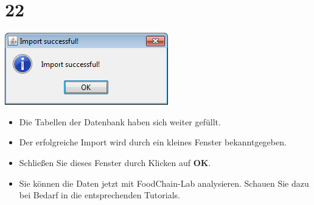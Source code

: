 \documentclass{beamer}
\begin{document}
\section{22}
\begin{frame}
	\begin{center}
  		\includegraphics[height=0.3\textheight]{22.png}
	\end{center}
	\begin{itemize}
		\item Die Tabellen der Datenbank haben sich weiter gefüllt.
		\item Der erfolgreiche Import wird durch ein kleines Fenster  bekanntgegeben.
		\item Schließen Sie dieses Fenster durch Klicken auf \textbf{OK}.
		\item Sie können die Daten jetzt mit FoodChain-Lab analysieren. Schauen Sie dazu bei Bedarf in die entsprechenden Tutorials.
	\end{itemize}
\end{frame}
\end{document}
